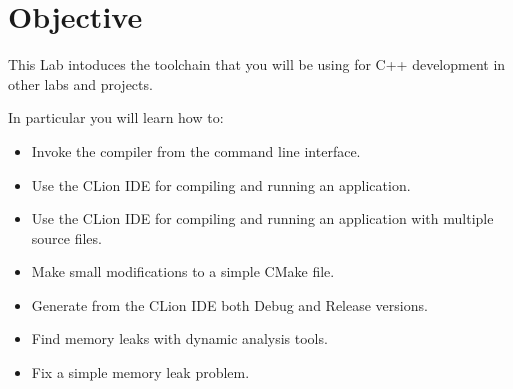 \section{Objective}

This Lab intoduces the toolchain that you will be using for C++
development in other labs and projects.

In particular you will learn how to:

\begin{itemize}

  \item Invoke the compiler from the command line interface.
  \item Use the CLion IDE for compiling and running an application.
  \item Use the CLion IDE for compiling and running an application with multiple source files.
  \item Make small modifications to a simple CMake file.
  \item Generate from the CLion IDE both Debug and Release versions.
  \item Find memory leaks with dynamic analysis tools.
  \item Fix a simple memory leak problem.

\end{itemize}
